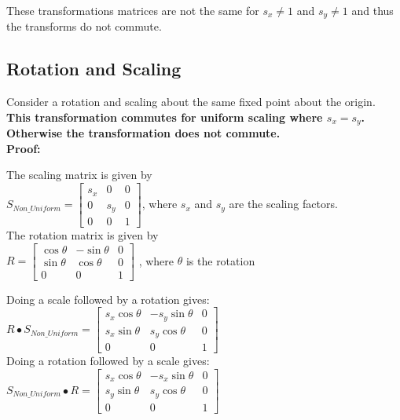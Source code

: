 \documentclass[a4paper,10pt]{scrartcl}
\begin{document}
These transformations matrices are not the same for $s_x \neq 1$ and $s_y \neq 1$ and thus the transforms do not commute.

\subsection{Rotation and Scaling}

Consider a rotation and scaling about the same fixed point about the origin. {\bfseries This transformation commutes for uniform scaling where $s_x = s_y$. Otherwise the transformation does not commute.}\\

{\bfseries Proof:}

The scaling matrix is given by \\

$S_{Non\_Uniform} = \begin{bmatrix}
    s_x       & 0 & 0 \\
    0       & s_y & 0 \\
    0       & 0 & 1     
 \end{bmatrix}
$, where $s_x$ and $s_y$ are the scaling factors. \\

The rotation matrix is given by \\

$R = \begin{bmatrix}
      \cos{\theta}       & -\sin{\theta} & 0 \\
      \sin{\theta}       & \cos{\theta} & 0 \\
      0       & 0 & 1             
     \end{bmatrix}
$   , where $\theta$ is the rotation

Doing a scale followed by a rotation gives: \\

$R \bullet S_{Non\_Uniform} = \begin{bmatrix}
		  s_x\cos{\theta} & -s_y\sin{\theta} & 0 \\
		  s_x\sin{\theta} & s_y\cos{\theta} & 0 \\
		  0 & 0 & 1
               \end{bmatrix}
$ \\


Doing a rotation followed by a scale gives: \\

$S_{Non\_Uniform} \bullet R = \begin{bmatrix}
		  s_x\cos{\theta} & -s_x\sin{\theta} & 0 \\
		  s_y\sin{\theta} & s_y\cos{\theta} & 0 \\
		  0 & 0 & 1
               \end{bmatrix}
$ \\
\end{document}
